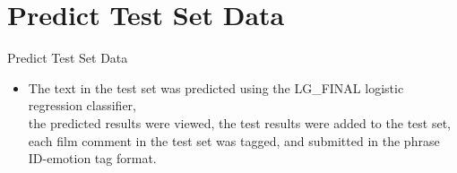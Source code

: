 \documentclass[
 size=14pt,
 paper=smartboard,  %
 mode=present, 		%
 display=slides, 	%
 style=tuliplab,  	%
 pauseslide,
 fleqn,leqno]{powerdot}
\begin{document}
\section{Predict Test Set Data}
\begin{slide}{Predict Test Set Data}
\begin{itemize}
 \item 
  The text in the test set was predicted using the LG_FINAL logistic regression classifier, 
\\the predicted results were viewed, the test results were added to the test set, 
 each film comment in the test set was tagged, and submitted in the phrase ID-emotion tag format.

\end{itemize}

\end{slide}

  
\end{document}
